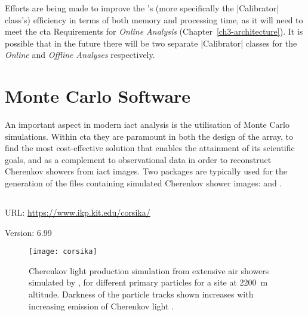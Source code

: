 Efforts are being made to improve the 's (more specifically the |Calibrator| class's) efficiency in terms of both memory and processing time, as it will need to meet the \gls{cta} Requirements for \textit{Online Analysis} (Chapter~\ref{ch3-architecture}). It is possible that in the future there will be two separate |Calibrator| classes for the \textit{Online} and \textit{Offline Analyses} respectively.

\section{Monte Carlo Software}

An important aspect in modern \gls{iact} analysis is the utilisation of Monte Carlo simulations. Within \gls{cta} they are paramount in both the design of the array, to find the most cost-effective solution that enables the attainment of its scientific goals, and as a complement to observational data in order to reconstruct Cherenkov showers from \gls{iact} images. Two packages are typically used for the generation of the files containing simulated Cherenkov shower images:  and .

\subsection{}
\vspace{-0.7em}
\noindent \hspace{\parindent} {\tiny URL: \url{https://www.ikp.kit.edu/corsika/} \par}
\noindent \hspace{\parindent} {\tiny Version: 6.99 \par}

\begin{figure}
  \texttt{[image: corsika]}
  \caption[ extensive air shower simulations.]{Cherenkov light production simulation from extensive air showers simulated by , for different primary particles for a site at \SI{2200}{m} altitude. Darkness of the particle tracks shown increases with increasing emission of Cherenkov light \cite{Bernlohr2008}.}
  \label{fig:corsika}
\end{figure}


